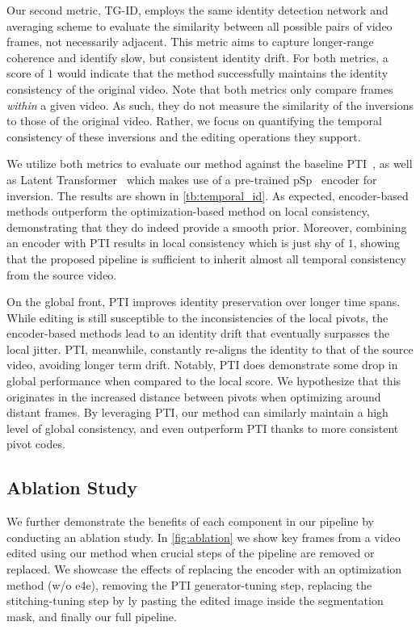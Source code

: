 Our second metric, TG-ID, employs the same identity detection network and averaging scheme to evaluate the similarity between all possible pairs of video frames, not necessarily adjacent. This metric aims to capture longer-range coherence and identify slow, but consistent identity drift.
For both metrics, a score of $1$ would indicate that the method successfully maintains the identity consistency of the original video.
Note that both metrics only compare frames \textit{within} a given video. As such, they do not measure the similarity of the inversions to those of the original video. Rather, we focus on quantifying the temporal consistency of these inversions and the editing operations they support.

We utilize both metrics to evaluate our method against the baseline PTI~\cite{roich2021pivotal}, as well as Latent Transformer~\cite{yao2021latent} which makes use of a pre-trained pSp~\cite{richardson2020encoding} encoder for inversion. The results are shown in \cref{tb:temporal_id}. As expected, encoder-based methods outperform the optimization-based method on local consistency, demonstrating that they do indeed provide a smooth prior. Moreover, combining an encoder with PTI results in local consistency which is just shy of $1$, showing that the proposed pipeline is sufficient to inherit almost all temporal consistency from the source video.


On the global front, PTI improves identity preservation over longer time spans. While editing is still susceptible to the inconsistencies of the local pivots, the encoder-based methods lead to an identity drift that eventually surpasses the local jitter. PTI, meanwhile, constantly re-aligns the identity to that of the source video, avoiding longer term drift. Notably, PTI does demonstrate some drop in global performance when compared to the local score. We hypothesize that this originates in the increased distance between pivots when optimizing around distant frames.
By leveraging PTI, our method can similarly maintain a high level of global consistency, and even outperform PTI thanks to more consistent pivot codes.



\subsection{Ablation Study}
\label{sec:ablation}

We further demonstrate the benefits of each component in our pipeline by conducting an ablation study. In \cref{fig:ablation} we show key frames from a video edited using our method when crucial steps of the pipeline are removed or replaced. We showcase the effects of replacing the encoder with an optimization method (w/o e4e), removing the PTI generator-tuning step, replacing the stitching-tuning step by {\naive}ly pasting the edited image inside the segmentation mask, and finally our full pipeline.

